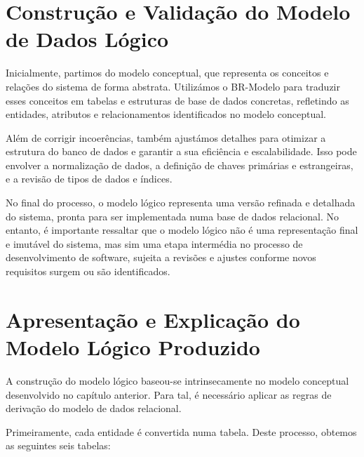 \documentclass[a4paper,12pt]{scrreprt}
\begin{document}
    \section{Construção e Validação do Modelo de Dados Lógico}

               Inicialmente, partimos do modelo conceptual, que representa os conceitos e relações do sistema de forma abstrata. Utilizámos o BR-Modelo para traduzir esses conceitos em tabelas e estruturas de base de dados concretas, refletindo as entidades, atributos e relacionamentos identificados no modelo conceptual.

        Além de corrigir incoerências, também ajustámos detalhes para otimizar a estrutura do banco de dados e garantir a sua eficiência e escalabilidade. Isso pode envolver a normalização de dados, a definição de chaves primárias e estrangeiras, e a revisão de tipos de dados e índices.
    
        No final do processo, o modelo lógico representa uma versão refinada e detalhada do sistema, pronta para ser implementada numa base de dados relacional. No entanto, é importante ressaltar que o modelo lógico não é uma representação final e imutável do sistema, mas sim uma etapa intermédia no processo de desenvolvimento de software, sujeita a revisões e ajustes conforme novos requisitos surgem ou são identificados.
        
    \clearpage
        
    \section{Apresentação e Explicação do Modelo Lógico Produzido}
        
        A construção do modelo lógico baseou-se intrinsecamente no modelo conceptual desenvolvido no capítulo anterior. Para tal, é necessário aplicar as regras de derivação do modelo de dados relacional.

        Primeiramente, cada entidade é convertida numa tabela. Deste processo, obtemos as seguintes seis tabelas:
\end{document}
